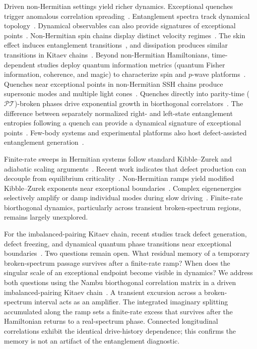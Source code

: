 \documentclass[aps,prb,reprint,superscriptaddress,amsmath,amssymb,floatfix]{revtex4-2}
\begin{document}
Driven non-Hermitian settings yield richer dynamics.
%
Exceptional quenches trigger anomalous correlation spreading~\cite{BacsiDora2021}. Entanglement spectra track dynamical topology~\cite{Sayyad2021,Starchl2022}. 
Dynamical observables can also provide signatures of exceptional points~\cite{PhysRevA.110.012226}.
Non-Hermitian spin chains display distinct velocity regimes~\cite{TurkeshiSchiro2023}. The skin effect induces entanglement transitions~\cite{KawabataNumasawaRyu2023}, and dissipation produces similar transitions in Kitaev chains~\cite{Zhou2024}.
%
Beyond non-Hermitian Hamiltonians, time-dependent studies deploy quantum information metrics (quantum Fisher information, coherence, and magic) to characterize spin and $p$-wave platforms~\cite{PhysRevA.82.052317,Jafari2015,PhysRevA.98.052338,PhysRevA.101.062105,JafariAkbari2021,Ansari2024}. Quenches near exceptional points in non-Hermitian SSH chains produce supersonic modes and multiple light cones~\cite{BacsiDora2021}. Quenches directly into parity-time ($\mathcal{PT}$)-broken phases drive exponential growth in biorthogonal correlators~\cite{LuChang2026}. 
The difference between separately normalized right- and left-state entanglement entropies following a quench can provide a dynamical signature of exceptional points~\cite{Lakkaraju2026}.
Few-body systems and experimental platforms also host defect-assisted entanglement generation~\cite{Li2023Entanglement,Han2023Exceptional}.

Finite-rate sweeps in Hermitian systems follow standard Kibble--Zurek and adiabatic scaling arguments~\cite{Dziarmaga2010}. Recent work indicates that defect production can decouple from equilibrium criticality~\cite{JafariAkbariKZM2026}. Non-Hermitian ramps yield modified Kibble--Zurek exponents near exceptional boundaries~\cite{DoraHeylMoessner2019}. Complex eigenenergies selectively amplify or damp individual modes during slow driving~\cite{WangLangChong2018}. 
Finite-rate biorthogonal dynamics, particularly across transient broken-spectrum regions, remains largely unexplored.


For the imbalanced-pairing Kitaev chain, recent studies track defect generation, defect freezing, and dynamical quantum phase transitions near exceptional boundaries~\cite{JafariKZM2026,Jafari2026}. Two questions remain open. What residual memory of a temporary broken-spectrum passage survives after a finite-rate ramp? When does the singular scale of an exceptional endpoint become visible in dynamics?
%
We address both questions using the Nambu biorthogonal correlation matrix in a driven imbalanced-pairing Kitaev chain~\cite{Kitaev2001,Li2018}. A transient excursion across a broken-spectrum interval acts as an amplifier. The integrated imaginary splitting accumulated along the ramp sets a finite-rate excess that survives after the Hamiltonian returns to a real-spectrum phase. Connected longitudinal correlations exhibit the identical drive-history dependence; this confirms the memory is not an artifact of the entanglement diagnostic.
\end{document}
